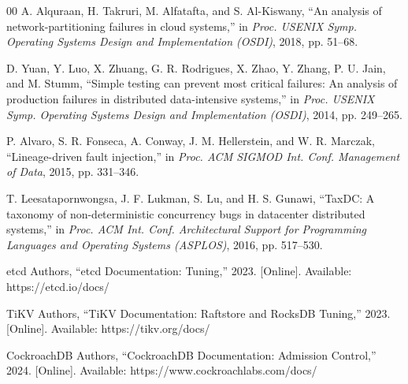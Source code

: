 \documentclass[conference, a4paper]{IEEEtran}
\begin{document}
\begin{thebibliography}{00}
A. Alquraan, H. Takruri, M. Alfatafta, and S. Al-Kiswany, ``An analysis
of network-partitioning failures in cloud systems,'' in \textit{Proc.
USENIX Symp. Operating Systems Design and Implementation (OSDI)}, 2018,
pp. 51--68.

D. Yuan, Y. Luo, X. Zhuang, G. R. Rodrigues, X. Zhao, Y. Zhang, P. U.
Jain, and M. Stumm, ``Simple testing can prevent most critical failures:
An analysis of production failures in distributed data-intensive
systems,'' in \textit{Proc. USENIX Symp. Operating Systems Design and
Implementation (OSDI)}, 2014, pp. 249--265.

P. Alvaro, S. R. Fonseca, A. Conway, J. M. Hellerstein, and
W. R. Marczak, ``Lineage-driven fault injection,'' in \textit{Proc. ACM
SIGMOD Int. Conf. Management of Data}, 2015, pp. 331--346.

T. Leesatapornwongsa, J. F. Lukman, S. Lu, and H. S. Gunawi, ``TaxDC: A
taxonomy of non-deterministic concurrency bugs in datacenter distributed
systems,'' in \textit{Proc. ACM Int. Conf. Architectural Support for
Programming Languages and Operating Systems (ASPLOS)}, 2016, pp. 517--530.

etcd Authors, ``etcd Documentation: Tuning,'' 2023. [Online]. Available:
https://etcd.io/docs/

TiKV Authors, ``TiKV Documentation: Raftstore and RocksDB Tuning,'' 2023.
[Online]. Available: https://tikv.org/docs/

CockroachDB Authors, ``CockroachDB Documentation: Admission Control,''
2024. [Online]. Available: https://www.cockroachlabs.com/docs/

\end{thebibliography}
\end{document}
